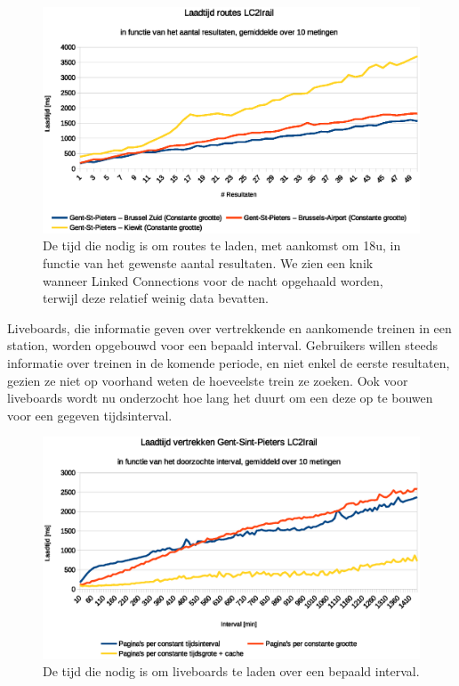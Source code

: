 \begin{figure}[h]
	\centering
	\includegraphics[width=1.00\textwidth]{images/Laadtijd_routes.eps}
	\caption[Laadtijd routes in functie van aantal resultaten]{De tijd die nodig is om routes te laden, met aankomst om 18u, in functie van het gewenste aantal resultaten. We zien een knik wanneer Linked Connections voor de nacht opgehaald worden, terwijl deze relatief weinig data bevatten.}
	\label{fig:responsetimeperresultsroute}
\end{figure}

Liveboards, die informatie geven over vertrekkende en aankomende treinen in een station, worden opgebouwd voor een bepaald interval. Gebruikers willen steeds informatie over treinen in de komende periode, en niet enkel de eerste resultaten, gezien ze niet op voorhand weten de hoeveelste trein ze zoeken. Ook voor liveboards wordt nu onderzocht hoe lang het duurt om een deze op te bouwen voor een gegeven tijdsinterval.

\begin{figure}[h]
	\centering
	\includegraphics[width=1.0\textwidth]{images/Laadtijd_vertrekken.eps}
	\caption[Laadtijd liveboards in functie van het overlopen interval]{De tijd die nodig is om liveboards te laden over een bepaald interval.}
	\label{fig:responsetimeperintervalliveboards}
\end{figure}

